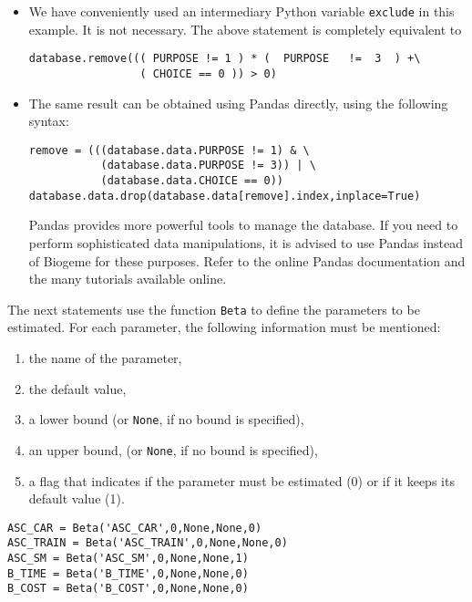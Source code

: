 \documentclass[12pt,a4paper]{article}
\begin{document}
\begin{itemize}
\item We have conveniently used an intermediary Python variable
\lstinline+exclude+ in this example. It is not necessary. The above
statement is completely equivalent to 
\begin{lstlisting}[style=nonumbers]
database.remove((( PURPOSE != 1 ) * (  PURPOSE   !=  3  ) +\
                 ( CHOICE == 0 )) > 0)
\end{lstlisting}
\item The same result can be obtained using Pandas
directly, using the following syntax:
\begin{lstlisting}[style=nonumbers]
remove = (((database.data.PURPOSE != 1) & \
           (database.data.PURPOSE != 3)) | \
           (database.data.CHOICE == 0))
database.data.drop(database.data[remove].index,inplace=True)
\end{lstlisting}
Pandas provides more powerful tools to manage the database. If you
need to perform sophisticated data manipulations, it is advised to use
Pandas instead of Biogeme for these purposes. Refer to the online
Pandas documentation and the many tutorials available online. 
\end{itemize}

The next statements use the function \lstinline+Beta+ to define the parameters to be estimated. For each parameter, the following information must be mentioned:
\begin{enumerate}
\item the name of the parameter,
\item the default value,
\item a lower bound (or \lstinline+None+, if no bound is specified),
\item an upper bound, (or \lstinline+None+, if no bound is specified),
\item a flag that indicates if the parameter must be estimated (0) or
  if it keeps its default value (1).
\end{enumerate}

\begin{lstlisting}[style=nonumbers]
ASC_CAR = Beta('ASC_CAR',0,None,None,0)
ASC_TRAIN = Beta('ASC_TRAIN',0,None,None,0)
ASC_SM = Beta('ASC_SM',0,None,None,1)
B_TIME = Beta('B_TIME',0,None,None,0)
B_COST = Beta('B_COST',0,None,None,0)
\end{lstlisting}
\end{document}
